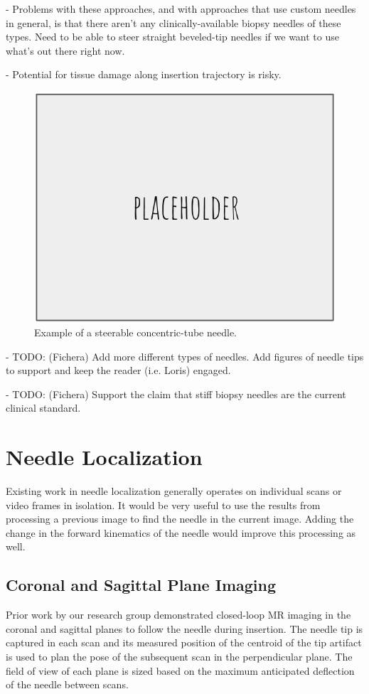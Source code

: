 - Problems with these approaches, and with approaches that use custom needles in general, is that there aren't any clinically-available biopsy needles of these types. Need to be able to steer straight beveled-tip needles if we want to use what's out there right now.

- Potential for tissue damage along insertion trajectory is risky.

\begin{figure}[h]
\includegraphics[width=1.0\textwidth]{Fig/placeholder.png}
\caption{Example of a steerable concentric-tube needle\cite{webster_mechanics_2009}.}
\label{fig:concentric_tubes}
\end{figure}


- TODO: (Fichera) Add more different types of needles. Add figures of needle tips to support and keep the reader (i.e. Loris) engaged.

- TODO: (Fichera) Support the claim that stiff biopsy needles are the current clinical standard.




\section{Needle Localization}
Existing work in needle localization generally operates on individual scans or video frames in isolation. It would be very useful to use the results from processing a previous image to find the needle in the current image. Adding the change in the forward kinematics of the needle would improve this processing as well.

\subsection{Coronal and Sagittal Plane Imaging}
Prior work by our research group demonstrated closed-loop MR imaging in the coronal and sagittal planes to follow the needle during insertion\cite{patel_closed-loop_2015}. The needle tip is captured in each scan and its measured position of the centroid of the tip artifact is used to plan the pose of the subsequent scan in the perpendicular plane. The field of view of each plane is sized based on the maximum anticipated deflection of the needle between scans.

